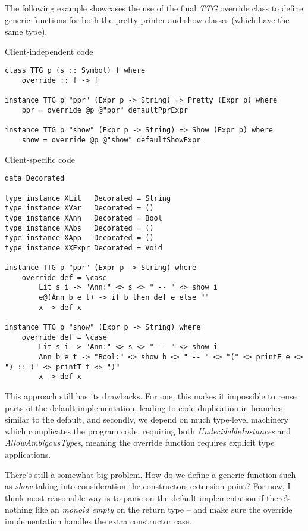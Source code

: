 \documentclass{article}
\begin{document}
The following example showcases the use of the final \emph{TTG} override class
to define generic functions for both the pretty printer and show classes (which
have the same type).

Client-independent code
\begin{lstlisting}
class TTG p (s :: Symbol) f where
    override :: f -> f

instance TTG p "ppr" (Expr p -> String) => Pretty (Expr p) where
    ppr = override @p @"ppr" defaultPprExpr

instance TTG p "show" (Expr p -> String) => Show (Expr p) where
    show = override @p @"show" defaultShowExpr
\end{lstlisting}

Client-specific code
\begin{lstlisting}
data Decorated

type instance XLit   Decorated = String
type instance XVar   Decorated = ()
type instance XAnn   Decorated = Bool
type instance XAbs   Decorated = ()
type instance XApp   Decorated = ()
type instance XXExpr Decorated = Void

instance TTG p "ppr" (Expr p -> String) where
    override def = \case
        Lit s i -> "Ann:" <> s <> " -- " <> show i
        e@(Ann b e t) -> if b then def e else ""
        x -> def x

instance TTG p "show" (Expr p -> String) where
    override def = \case
        Lit s i -> "Ann:" <> s <> " -- " <> show i
        Ann b e t -> "Bool:" <> show b <> " -- " <> "(" <> printE e <> ") :: (" <> printT t <> ")"
        x -> def x
\end{lstlisting}

This approach still has its drawbacks. For one, this makes it impossible to
reuse parts of the default implementation, leading to code duplication in
branches similar to the default, and secondly, we depend on much type-level
machinery which complicates the program code, requiring both
\emph{UndecidableInstances} and \emph{AllowAmbigousTypes}, meaning the override
function requires explicit type applications.

There's still a somewhat big problem. How do we define a generic function such as
\emph{show} taking into consideration the constructors extension point? For
now, I think most reasonable way is to panic on the default implementation if there's
nothing like an \emph{monoid empty} on the return type -- and make sure the
override implementation handles the extra constructor case.
\end{document}
